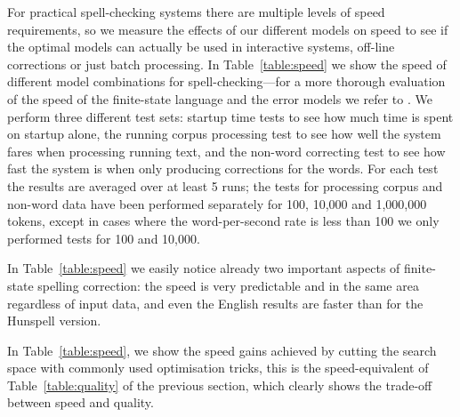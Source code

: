 \documentclass[a4paper,12pt]{article}
\begin{document}
For practical spell-checking systems there are multiple levels of speed
requirements, so we measure the effects of our different models on speed to see
if the optimal models can actually be used in interactive systems, off-line
corrections or just batch processing. In Table~\ref{table:speed} we show the
speed of different model combinations for spell-checking---for a more thorough
evaluation of the speed of the finite-state language and the error models we
refer to \cite{pirinen2012improving}. We perform three different test sets:
startup time tests to see how much time is spent on startup alone, the running
corpus processing test to see how well the system fares when processing running
text, and the non-word correcting test to see how fast the system is when only
producing corrections for the words. For each test the results are averaged
over at least 5 runs; the tests for processing corpus and non-word data have
been performed separately for 100, 10,000 and 1,000,000 tokens, except in cases
where the word-per-second rate is less than 100 we only performed tests for 100
and 10,000.


In Table~\ref{table:speed} we easily notice already two important aspects of
finite-state spelling correction: the speed is very predictable and in the same
area regardless of input data, and even the English results are faster than for
the Hunspell version. 

In Table~\ref{table:speed}, we show the speed gains achieved by cutting the
search space with commonly used optimisation tricks, this is the
speed-equivalent of Table~\ref{table:quality} of the previous section, which
clearly shows the trade-off between speed and quality.
\end{document}
